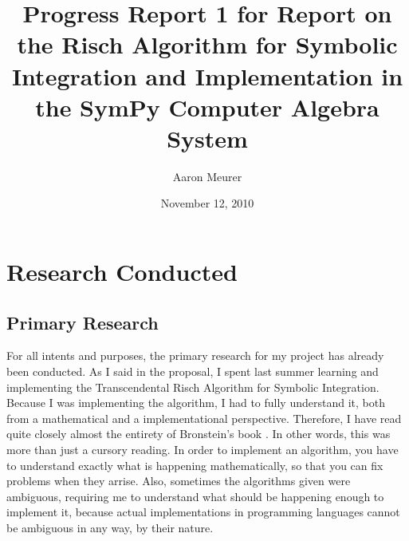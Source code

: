 \documentclass[12pt]{article}
\begin{document}
\title{Progress Report 1 for Report on the Risch Algorithm for Symbolic
Integration and Implementation in the Sym\-Py Computer Algebra System}
\author{Aaron Meurer}
\date{November 12, 2010}
\maketitle


\section{Research Conducted}
\subsection{Primary Research}
For all intents and purposes, the primary research for my project has
already been conducted.  As I said in the proposal, I spent last summer
learning and implementing the Transcendental Risch Algorithm for
Symbolic Integration. Because I was implementing the algorithm, I had to
fully understand it, both from a mathematical and a implementational
perspective.  Therefore, I have read quite closely almost the entirety
of Bronstein's book \cite{bronstein2005symbolic}.  In other words, this was
more than just a cursory reading.  In order to implement an algorithm,
you have to understand exactly what is happening mathematically, so that
you can fix problems when they arrise.  Also, sometimes the algorithms
given were ambiguous, requiring me to understand what should be
happening enough to implement it, because actual implementations in
programming languages cannot be ambiguous in any way, by their nature.
\end{document}
